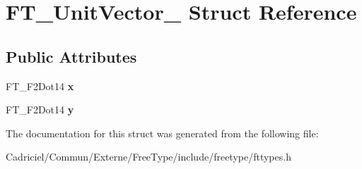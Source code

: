 \hypertarget{struct_f_t___unit_vector__}{\section{F\-T\-\_\-\-Unit\-Vector\-\_\- Struct Reference}
\label{struct_f_t___unit_vector__}
}
\subsection*{Public Attributes}
\begin{DoxyCompactItemize}
\item 
\hypertarget{struct_f_t___unit_vector___a03c9f8ae35a5ad1bcac49995a9dac714}{F\-T\-\_\-\-F2\-Dot14 {\bfseries x}}\label{struct_f_t___unit_vector___a03c9f8ae35a5ad1bcac49995a9dac714}

\item 
\hypertarget{struct_f_t___unit_vector___a12eb9ad5c47614f5f2d3f9e401933d0e}{F\-T\-\_\-\-F2\-Dot14 {\bfseries y}}\label{struct_f_t___unit_vector___a12eb9ad5c47614f5f2d3f9e401933d0e}

\end{DoxyCompactItemize}


The documentation for this struct was generated from the following file\-:\begin{DoxyCompactItemize}
\item 
Cadriciel/\-Commun/\-Externe/\-Free\-Type/include/freetype/fttypes.\-h\end{DoxyCompactItemize}
